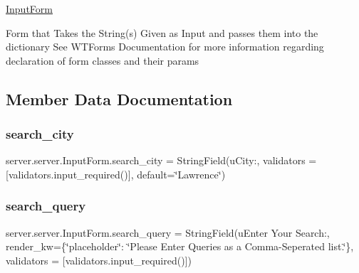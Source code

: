 \mbox{\hyperlink{classserver_1_1server_1_1_input_form}{Input\+Form}}

Form that Takes the String(s) Given as Input and passes them into the dictionary See W\+T\+Forms Documentation for more information regarding declaration of form classes and their params 

\subsection{Member Data Documentation}
\mbox{\label{classserver_1_1server_1_1_input_form_a219d510984378b86ca3c87003cba3ab2}} 
\subsubsection{\texorpdfstring{search\+\_\+city}{search\_city}}
{\footnotesize\ttfamily server.\+server.\+Input\+Form.\+search\+\_\+city = String\+Field(u\textquotesingle{}City\+:\textquotesingle{}, validators = \mbox{[}validators.\+input\+\_\+required()\mbox{]}, default=\char`\"{}Lawrence\char`\"{})\hspace{0.3cm}{\ttfamily [static]}}

\mbox{\label{classserver_1_1server_1_1_input_form_ab4f0118c5e7a7ecc3ca50d7f781f2de2}} 
\subsubsection{\texorpdfstring{search\+\_\+query}{search\_query}}
{\footnotesize\ttfamily server.\+server.\+Input\+Form.\+search\+\_\+query = String\+Field(u\textquotesingle{}Enter Your Search\+:\textquotesingle{}, render\+\_\+kw=\{\char`\"{}placeholder\char`\"{}\+: \char`\"{}Please Enter Queries as a Comma-\/Seperated list.\char`\"{}\}, validators = \mbox{[}validators.\+input\+\_\+required()\mbox{]})\hspace{0.3cm}{\ttfamily [static]}}

\mbox{\label{classserver_1_1server_1_1_input_form_ad899681ccf68ae96f24ae575e3142635}} 
